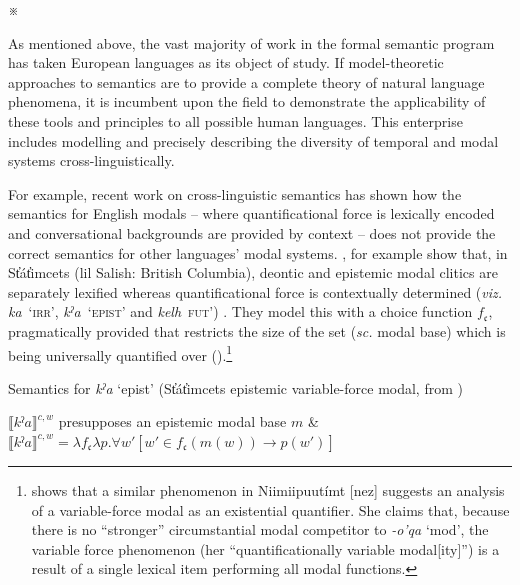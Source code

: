 \documentclass[12pt,dvipsnames]{report}
\providecommand{\denote}[2][]{\ensuremath{\llbracket{#2}\rrbracket^{#1}}}
\newcommand{\fancybreak}{\begin{center}
		\huge\sf	 ※ %
\end{center}

\noindent}
\begin{document}
\xe


\fancybreak 
As mentioned above, the vast majority of work in the formal semantic program has taken European languages as its object of study. If model-theoretic approaches to semantics are to provide a complete theory of natural language phenomena, it is incumbent upon the field to demonstrate the applicability of these tools and principles to all possible human languages. This enterprise includes modelling and precisely describing the diversity of temporal and modal systems cross-linguistically.

For example, recent work on cross-linguistic semantics has shown how the semantics for English modals -- where quantificational force is lexically encoded and conversational backgrounds are provided by context -- does not provide the correct semantics for other languages' modal systems. \citet{Rullmann2008}, for example show that, in St̓át̓imcets (\gls{lil} Salish: British Columbia), deontic and epistemic modal clitics are separately lexified whereas quantificational force is contextually determined (\textit{viz.} \textit{ka}~`\textsc{irr}', \textit{kˀa}~`\textsc{epist}' and \textit{kelh}~\textsc{fut}') \citep[see also][]{Peterson2010,Matthewson2010}. They model this with a choice function $ f_{\mathfrak c}$, pragmatically provided that restricts the size of the set (\textit{sc.} modal base) which is being universally quantified over (\nextx).\footnote{\citet{Deal2011} shows that a similar phenomenon in Niimiipuutímt [\gls{nez}] suggests an analysis of a variable-force modal as an existential quantifier. She claims that, because there is no ``stronger'' circumstantial modal competitor to \textit{-o'qa} `\gls{mod}', the variable force phenomenon (her ``quantificationally variable modal[ity]'') is a result of a single lexical item performing all modal functions.}

\pex Semantics for \textit{kˀa} `\gls{epist}' (St̓át̓imcets epistemic variable-force modal, from \citealp[340]{Rullmann2008})

\denote[c,w]{\textit{kˀa}} presupposes an epistemic modal base $ m $ \&\\
$ \denote[c,w]{\textit{kˀa}}=\lambda f_{\mathfrak c}\lambda p.\forall w'[w'\in f_{\mathfrak c}(m(w))\to p(w')]$
\xe
\end{document}
